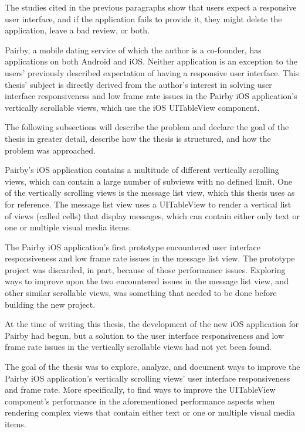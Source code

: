\documentclass[a4paper,12pt]{article}
\begin{document}
The studies cited in the previous paragraphs show that users expect a responsive user interface, and if the application fails to provide it, they might delete the application, leave a bad review, or both.

Pairby, a mobile dating service of which the author is a co-founder, has applications on both Android and iOS. Neither application is an exception to the users' previously described expectation of having a responsive user interface. This thesis' subject is directly derived from the author's interest in solving user interface responsiveness and low frame rate issues in the Pairby iOS application's vertically scrollable views, which use the iOS UITableView component.

The following subsections will describe the problem and declare the goal of the thesis in greater detail, describe how the thesis is structured, and how the problem was approached.

Pairby's iOS application contains a multitude of different vertically scrolling views, which can contain a large number of subviews with no defined limit. One of the vertically scrolling views is the message list view, which this thesis uses as for reference. The message list view uses a UITableView to render a vertical list of views (called cells) that display messages, which can contain either only text or one or multiple visual media items.

The Pairby iOS application's first prototype encountered user interface responsiveness and low frame rate issues in the message list view. The prototype project was discarded, in part, because of those performance issues. Exploring ways to improve upon the two encountered issues in the message list view, and other similar scrollable views, was something that needed to be done before building the new project.

At the time of writing this thesis, the development of the new iOS application for Pairby had begun, but a solution to the user interface responsiveness and low frame rate issues in the vertically scrollable views had not yet been found.

\label{subsec:goal-of-the-thesis}
The goal of the thesis was to explore, analyze, and document ways to improve the Pairby iOS application's vertically scrolling views' user interface responsiveness and frame rate. More specifically, to find ways to improve the UITableView component's performance in the aforementioned performance aspects when rendering complex views that contain either text or one or multiple visual media items.
\end{document}
